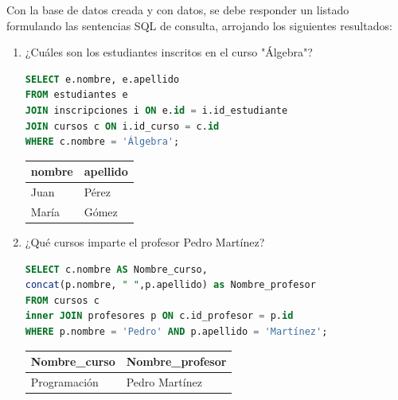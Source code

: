 \documentclass[12pt,letterpaper]{article}
\begin{document}
Con la base de datos creada y con datos, se debe  responder un listado formulando las sentencias SQL de consulta, arrojando los siguientes resultados:

\begin{enumerate}
    \item ¿Cuáles son los estudiantes inscritos en el curso "Álgebra"?
\begin{lstlisting}[language=SQL, frame=single]
SELECT e.nombre, e.apellido 
FROM estudiantes e 
JOIN inscripciones i ON e.id = i.id_estudiante 
JOIN cursos c ON i.id_curso = c.id 
WHERE c.nombre = 'Álgebra';
\end{lstlisting}
    \begin{table}[H]
        \centering
        \begin{tabular}{|l|l|}
        \hline
        \textbf{nombre} & \textbf{apellido} \\ \hline
        Juan & Pérez \\ 
        María & Gómez \\ \hline
        \end{tabular}
    \end{table}

    \item ¿Qué cursos imparte el profesor Pedro Martínez?
\begin{lstlisting}[language=SQL, frame=single]
SELECT c.nombre AS Nombre_curso, 
concat(p.nombre, " ",p.apellido) as Nombre_profesor
FROM cursos c
inner JOIN profesores p ON c.id_profesor = p.id 
WHERE p.nombre = 'Pedro' AND p.apellido = 'Martínez';
\end{lstlisting}
    \begin{table}[H]
        \centering
        \begin{tabular}{|l|l|}
        \hline
        \textbf{Nombre\_curso} & \textbf{Nombre\_profesor} \\ \hline
        Programación & Pedro Martínez \\ \hline
        \end{tabular}
    \end{table}


\end{enumerate}
\end{document}
